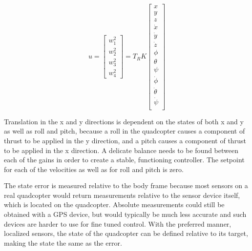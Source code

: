 \documentclass[letterpaper,12pt,titlepage,oneside,final]{book}
\begin{document}
\begin{equation} \label{eq:control_equation}
u = 
\begin{bmatrix}
w_{1}^{2} \\
w_{2}^{2} \\
w_{3}^{2} \\
w_{4}^{2}
\end{bmatrix}
= T_{R}K
\begin{bmatrix}
x \\
y \\
z \\
\dot{x} \\
\dot{y} \\
\dot{z} \\
\phi \\
\theta \\
\psi \\
\dot{\phi} \\
\dot{\theta} \\
\dot{\psi} \\
\end{bmatrix}
\end{equation}

Translation in the x and y directions is dependent on the states of both x and y as well as roll and pitch, because a roll in the quadcopter causes a component of thrust to be applied in the y direction, and a pitch causes a component of thrust to be applied in the x direction.
A delicate balance needs to be found between each of the gains in order to create a stable, functioning controller. 
The setpoint for each of the velocities as well as for roll and pitch is zero.


The state error is measured relative to the body frame because most sensors on a real quadcopter would return measurements relative to the sensor device itself, which is located on the quadcopter. Absolute measurements could still be obtained with a GPS device, but would typically be much less accurate and such devices are harder to use for fine tuned control. With the preferred manner, localized sensors, the state of the quadcopter can be defined relative to its target, making the state the same as the error.
\end{document}
